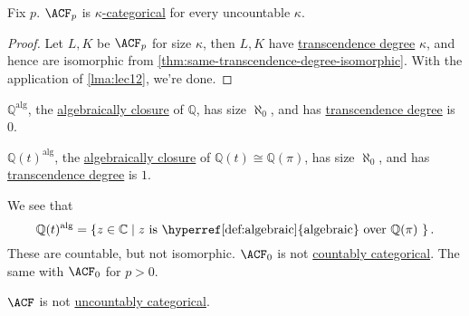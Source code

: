 \begin{theorem}
	Fix \(p\). \(\ACF_p \) is \hyperref[def:categorical]{\(\kappa \)-categorical} for every uncountable \(\kappa \).
\end{theorem}
\begin{proof}
	Let \(L, K\) be \(\ACF_p \) for size \(\kappa \), then \(L, K\) have \hyperref[def:transcendence-degree]{transcendence degree} \(\kappa \), and hence are isomorphic from \autoref{thm:same-transcendence-degree-isomorphic}. With the application of \autoref{lma:lec12}, we're done.
\end{proof}

\begin{eg}
	\(\mathbb{Q} ^\text{alg} \), the \hyperref[def:algebraically-closure]{algebraically closure} of \(\mathbb{Q} \), has size \(\aleph_0\), and has \hyperref[def:transcendence-degree]{transcendence degree} is \(0\).
\end{eg}

\begin{eg}
	\(\mathbb{Q} (t)^\text{alg} \), the \hyperref[def:algebraically-closure]{algebraically closure} of \(\mathbb{Q} (t) \cong \mathbb{Q} (\pi )\), has size \(\aleph_0\), and has \hyperref[def:transcendence-degree]{transcendence degree} is \(1\).
\end{eg}
\begin{explanation}
	We see that
	\[
		\mathbb{Q} (t)^{\text{alg} } = \left\{ z\in \mathbb{C} \mid \text{\(z\) is \hyperref[def:algebraic]{algebraic} over \(\mathbb{Q} (\pi )\) }  \right\}.
	\]
	These are countable, but not isomorphic. \(\ACF_0\) is not \hyperref[def:countably-categorical]{countably categorical}. The same with \(\ACF_0\) for \(p>0\).
\end{explanation}

\begin{note}
	\(\ACF\) is not \hyperref[def:uncountably-categorical]{uncountably categorical}.
\end{note}

